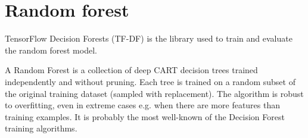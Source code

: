 \section{Random forest}

TensorFlow Decision Forests (TF-DF) \cite{TensorFlow:rf} is the library used to train and evaluate the random forest model.

A Random Forest \cite{breiman2001random} is a collection of deep CART decision trees trained independently and without pruning.
Each tree is trained on a random subset of the original training dataset (sampled with replacement).
The algorithm is robust to overfitting, even in extreme cases e.g. when there are more features than training examples.
It is probably the most well-known of the Decision Forest training algorithms.
